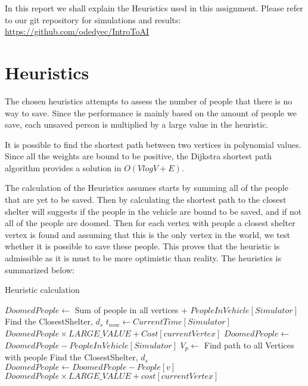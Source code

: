 \documentclass{article}                     %
\begin{document}
	
	In this report we shall explain the Heuristics used in this assignment. Please refer to our git repository for simulations and results:
	\url{https://github.com/odedyec/IntroToAI}



\section{Heuristics}
The chosen heuristics attempts to assess the number of people that there is no way to save. Since the performance is mainly based on the amount of people we save, each unsaved person is multiplied by a large value in the heuristic.

It is possible to find the shortest path between two vertices in polynomial values. Since all the weights are bound to be positive, the Dijkstra shortest path algorithm provides a solution in $ O(V logV+E) $.

The calculation of the Heuristics assumes starts by summing all of the people that are yet to be saved. Then by calculating the shortest path to the closest shelter will suggests if the people in the vehicle are bound to be saved, and if not all of the people are doomed. Then for each vertex with people a closest shelter vertex is found and assuming that this is the only vertex in the world, we test whether it is possible to save these people. This proves that the heuristic is admissible as it is must to be more optimistic than reality.
The heuristics is summarized below:

\begin{algorithm}
	\caption{Heuristic calculation}
	
	\begin{algorithmic}[1]
		\State $ DoomedPeople \longleftarrow$ Sum of people in all vertices + $ PeopleInVehicle[Simulator] $
		\State Find the ClosestShelter, $d_s$
		\State $ t_{now} \longleftarrow CurrentTime[Simulator] $
		\State \Return $ DoomedPeople \times LARGE\_VALUE + Cost[currentVertex]$
		\Else 
		\State $ DoomedPeople \longleftarrow$ $ DoomedPeople - PeopleInVehicle[Simulator]$ 
		\EndIf
		\State $ V_p \longleftarrow$ Find path to all Vertices with people
		\State Find the ClosestShelter, $d_s$
			\State $ DoomedPeople \longleftarrow DoomedPeople - People[v]$
		\EndIf
		\EndFor
		\State \Return $ DoomedPeople \times LARGE\_VALUE + cost[currentVertex]$
		\EndProcedure
	\end{algorithmic}
\end{algorithm}
\end{document}
